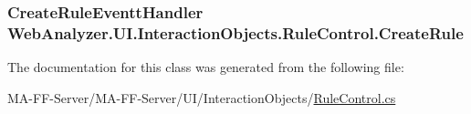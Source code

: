 \subsubsection[{Create\+Rule}]{\setlength{\rightskip}{0pt plus 5cm}Create\+Rule\+Eventt\+Handler Web\+Analyzer.\+U\+I.\+Interaction\+Objects.\+Rule\+Control.\+Create\+Rule}\label{class_web_analyzer_1_1_u_i_1_1_interaction_objects_1_1_rule_control_a7bf67a13195858fc69b81997bb629ec5}


The documentation for this class was generated from the following file\+:\begin{DoxyCompactItemize}
\item 
M\+A-\/\+F\+F-\/\+Server/\+M\+A-\/\+F\+F-\/\+Server/\+U\+I/\+Interaction\+Objects/\hyperlink{_rule_control_8cs}{Rule\+Control.\+cs}\end{DoxyCompactItemize}
